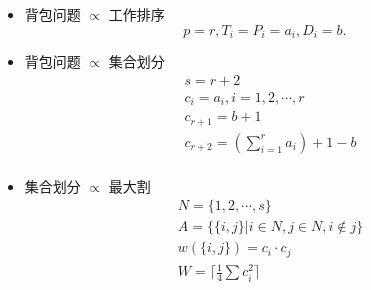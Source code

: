 \documentclass[twocolumn]{article}
\renewcommand\figurename{图}
\theoremstyle{nonumberplain}%
\begin{document}
\begin{CJK}{UTF8}{gbsn}
\begin{itemize}
    \item 背包问题 $\propto$ 工作排序
        $$p=r, T_i=P_i=a_i, D_i=b.$$

    \item 背包问题 $\propto$ 集合划分
        \begin{equation}\nonumber %
        \begin{aligned}
        &s=r+2\\
        &c_i=a_i,i=1,2,\cdots,r\\
        &c_{r+1}=b+1\\
        &c_{r+2}=(\sum_{i=1}^{r}a_i)+1-b\\
        \end{aligned}
        \end{equation}

    \item 集合划分 $\propto$ 最大割
        \begin{equation}\nonumber %
        \begin{aligned}
        &N=\{1,2,\cdots,s\}\\
        &A=\{\{i,j\}|i\in N,j\in N,i\notin j\}\\
        &w(\{i,j\})=c_i\cdot c_j\\
        &W=\lceil \frac14\sum c_i^2\rceil
        \end{aligned}
        \end{equation}

    \end{itemize}


\end{CJK}
\end{document}
